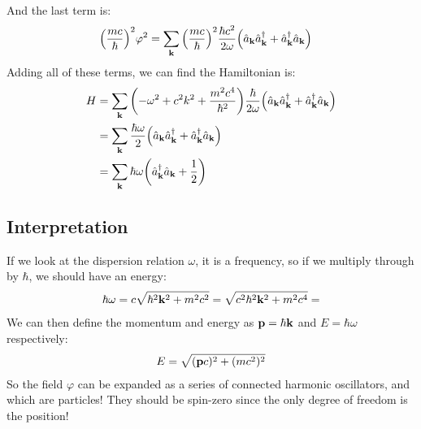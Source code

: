 \documentclass[12pt]{article}
\begin{document}
And the last term is:
\begin{align*}
  \qty(\frac{mc}{\hbar})^2\varphi^2&=
  \sum_{\vb{k}}\qty(\frac{mc}{\hbar})^2\frac{\hbar c^2}{2\omega}
  \qty(\hat{a}_{\vb{k}}\hat{a}^\dag_{\vb{k}}
  +\hat{a}^\dag_{\vb{k}}\hat{a}_{\vb{k}})
\end{align*}
Adding all of these terms, we can find the Hamiltonian is:
\begin{align*}
  H&=\sum_{\vb{k}}\qty(-\omega^2+c^2k^2+\frac{m^2c^4}{\hbar^2})
  \frac{\hbar}{2\omega}\qty(\hat{a}_{\vb{k}}\hat{a}^\dag_{\vb{k}}
  +\hat{a}^\dag_{\vb{k}}\hat{a}_{\vb{k}})\\
  &=\sum_{\vb{k}}\frac{\hbar\omega}{2}\qty(\hat{a}_{\vb{k}}\hat{a}^\dag_{\vb{k}}
  +\hat{a}^\dag_{\vb{k}}\hat{a}_{\vb{k}})\\
  &=\sum_{\vb{k}}\hbar\omega\qty(\hat{a}^\dag_{\vb{k}}\hat{a}_{\vb{k}}+\frac12)
\end{align*}

\subsection{Interpretation}
If we look at the dispersion relation $\omega$, it is a frequency, so if we multiply through by $\hbar$, we should have an energy:
\begin{align*}
  \hbar\omega=c\sqrt{\hbar^2\vb{k}^2+m^2c^2}=
  \sqrt{c^2\hbar^2\vb{k}^2+m^2c^4}=
\end{align*}
We can then define the momentum and energy as $\vb{p}=\hbar\vb{k}$ and $E=\hbar\omega$ respectively:
\begin{align*}
  E=\sqrt{(\vb{p}c)^2+(mc^2)^2}
\end{align*}
So the field $\varphi$ can be expanded as a series of connected harmonic oscillators, and which are particles! They should be spin-zero since the only degree of freedom is the position! 
\end{document}
